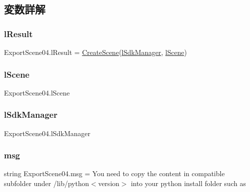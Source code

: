 \subsection{変数詳解}
\mbox{\label{namespace_export_scene04_a1de918afdf401b55a9d6348fb55f9870}} 
\subsubsection{\texorpdfstring{l\+Result}{lResult}}
{\footnotesize\ttfamily Export\+Scene04.\+l\+Result = \hyperlink{namespace_export_scene04_a7e8f386cc2dcb6e596b141e4b80eff56}{Create\+Scene}(\hyperlink{namespace_export_scene04_aeb9bf4e918a5e48b2921706dc613040a}{l\+Sdk\+Manager}, \hyperlink{namespace_export_scene04_ae1da8ef1dd6abfbcc60d9b6787dba521}{l\+Scene})}

\mbox{\label{namespace_export_scene04_ae1da8ef1dd6abfbcc60d9b6787dba521}} 
\subsubsection{\texorpdfstring{l\+Scene}{lScene}}
{\footnotesize\ttfamily Export\+Scene04.\+l\+Scene}

\mbox{\label{namespace_export_scene04_aeb9bf4e918a5e48b2921706dc613040a}} 
\subsubsection{\texorpdfstring{l\+Sdk\+Manager}{lSdkManager}}
{\footnotesize\ttfamily Export\+Scene04.\+l\+Sdk\+Manager}

\mbox{\label{namespace_export_scene04_a14ec26d578cac8a7a5d26cb48035ab68}} 
\subsubsection{\texorpdfstring{msg}{msg}}
{\footnotesize\ttfamily string Export\+Scene04.\+msg = \textquotesingle{}You need to copy the content in compatible subfolder under /lib/python$<$version$>$ into your python install folder such as \textquotesingle{}}

